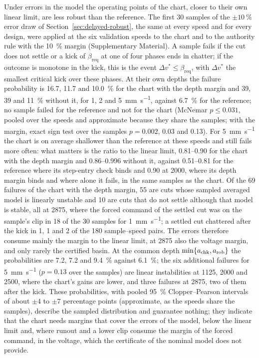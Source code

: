 Under errors in the model the operating points of the chart, closer to their own linear limit, are less robust than the reference. The first 30 samples of the $\pm\SI{10}{\percent}$ error draw of Section~\ref{sec:delayed-robust}, the same at every speed and for every design, were applied at the six validation speeds to the chart and to the authority rule with the \SI{10}{\percent} margin (Supplementary Material). A sample fails if the cut does not settle or a kick of $\beta_{\mathrm{req}}$ at one of four phases ends in chatter; if the outcome is monotone in the kick, this is the event $\Delta v^*\le\beta_{\mathrm{req}}$, with $\Delta v^*$ the smallest critical kick over these phases. At their own depths the failure probability is 16.7, 11.7 and \SI{10.0}{\percent} for the chart with the depth margin and 39, 39 and \SI{11}{\percent} without it, for 1, 2 and \SI{5}{\milli\metre\per\second}, against \SI{6.7}{\percent} for the reference; no sample failed for the reference and not for the chart (McNemar $p\le0.031$, pooled over the speeds and approximate because they share the samples; with the margin, exact sign test over the samples $p=0.002$, 0.03 and 0.13). For \SI{5}{\milli\metre\per\second} the chart is on average shallower than the reference at these speeds and still fails more often: what matters is the ratio to the linear limit, 0.81--0.90 for the chart with the depth margin and 0.86--0.996 without it, against 0.51--0.81 for the reference where its step-entry check binds and 0.90 at \SI{2000}{\rpm}, where its depth margin binds and where alone it fails, in the same samples as the chart. Of the 69 failures of the chart with the depth margin, 55 are cuts whose sampled averaged model is linearly unstable and 10 are cuts that do not settle although that model is stable, all at \SI{2875}{\rpm}, where the forced command of the settled cut was on the sample's clip in 18 of the 30 samples for \SI{1}{\milli\metre\per\second}; a settled cut chattered after the kick in 1, 1 and 2 of the 180 sample--speed pairs. The errors therefore consume mainly the margin to the linear limit, at \SI{2875}{\rpm} also the voltage margin, and only rarely the certified basin. At the common depth $\min\{a_{\mathrm{chk}},a_{\mathrm{rob}}\}$ the probabilities are 7.2, 7.2 and \SI{9.4}{\percent} against \SI{6.1}{\percent}; the six additional failures for \SI{5}{\milli\metre\per\second} ($p=0.13$ over the samples) are linear instabilities at 1125, 2000 and \SI{2500}{\rpm}, where the chart's gains are lower, and three failures at \SI{2875}{\rpm}, two of them after the kick. These probabilities, with pooled \SI{95}{\percent} Clopper--Pearson intervals of about $\pm4$ to $\pm7$ percentage points (approximate, as the speeds share the samples), describe the sampled distribution and guarantee nothing; they indicate that the chart needs margins that cover the errors of the model, below the linear limit and, where runout and a lower clip consume the margin of the forced command, in the voltage, which the certificate of the nominal model does not provide.
